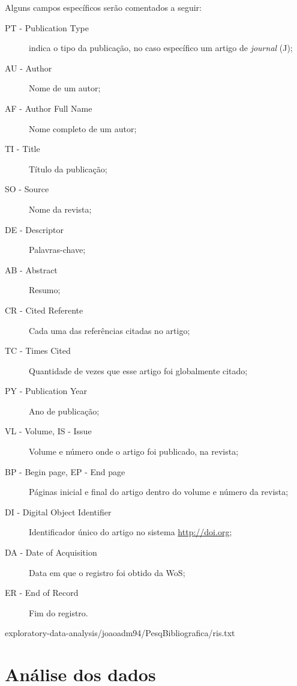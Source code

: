 Alguns campos específicos serão comentados a seguir:
\begin{description}
    \item [PT - Publication Type] indica o tipo da publicação, no caso específico um artigo de \textit{journal} (J);
    \item [AU - Author] Nome de um autor;
    \item [AF - Author Full Name] Nome completo de um autor;
    \item [TI - Title] Título da publicação;
    \item [SO - Source] Nome da revista;
    \item [DE - Descriptor] Palavras-chave;
    \item [AB - Abstract] Resumo;
    \item [CR - Cited Referente] Cada uma das referências citadas no artigo;
    \item [TC - Times Cited] Quantidade de vezes que esse artigo foi globalmente citado;
    \item [PY - Publication Year] Ano de publicação;
    \item [VL - Volume, IS - Issue] Volume e número onde o artigo foi publicado, na revista;
    \item [BP - Begin page, EP - End page] Páginas inicial e final do artigo dentro do volume e número da revista;
    \item [DI - Digital Object Identifier] Identificador único do artigo no sistema \url{http://doi.org};
    \item [DA - Date of Acquisition] Data em que o registro foi obtido da WoS;
    \item [ER - End of Record] Fim do registro.
\end{description}


{exploratory-data-analysis/joaoadm94/PesqBibliografica/ris.txt}

\section{Análise dos dados}



